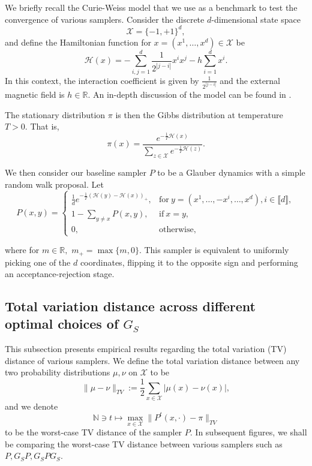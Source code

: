 \documentclass[EJP]{ejpecp} %
\begin{document}
We briefly recall the Curie-Weiss model that we use as a benchmark to test the convergence of various samplers. Consider the discrete $d$-dimensional state space 
$$\mathcal{X} = \{-1, +1\}^d,$$
and define the Hamiltonian function for $x = (x^1, \dots, x^d) \in \mathcal{X}$ be  
$$\mathcal{H}(x) = - \sum_{i,j=1}^d \frac{1}{2^{|j-i|}} x^i x^j - h \sum_{i=1}^d x^i.$$
In this context, the interaction coefficient is given by $\frac{1}{2^{|j-i|}}$ and the external magnetic field is $h \in \mathbb{R}$. An in-depth discussion of the model can be found in \cite{Bovier_denHollander_2015}.

The stationary distribution $\pi$ is then the Gibbs distribution at temperature $T > 0.$ That is, 
$$\pi(x) = \frac{e^{-\frac{1}{T} \mathcal{H}(x)}}{\sum_{z\in \mathcal{X}}e^{-\frac{1}{T} \mathcal{H}(z)}}.$$

We then consider our baseline sampler $P$ to be a Glauber dynamics with a simple random walk proposal. Let 
\begin{equation} \label{eq:glauber}
    P(x,y) = \begin{cases}
    \frac{1}{d} e^{-\frac{1}{T}(\mathcal{H}(y)-\mathcal{H}(x))_+}, & \mathrm{for}\ y = (x^1, \dots, -x^i, \dots, x^d), i \in \llbracket d \rrbracket,\\
    1-\sum_{y \neq x} P(x,y), & \mathrm{if}\ x = y,\\
    0, & \mathrm{otherwise,}
\end{cases}
\end{equation}

where for $m \in \mathbb{R},$ $m_+ = \max\{m,0\}$. This sampler is equivalent to uniformly picking one of the $d$ coordinates, flipping it to the opposite sign and performing an acceptance-rejection stage.

\subsection{Total variation distance across different optimal choices of $G_S$}
This subsection presents empirical results regarding the total variation (TV) distance of various samplers. We define the total variation distance between any two probability distributions $\mu, \nu$ on $\mathcal{X}$ to be 
$$\| \mu - \nu \|_{TV} := \frac{1}{2} \sum_{x\in \mathcal{X}} |\mu(x)-\nu(x)|,$$
and we denote
$$\mathbb{N} \ni t \mapsto \max_{x\in \mathcal{X}} \|P^t(x,\cdot) - \pi \|_{TV}$$
to be the worst-case TV distance of the sampler $P$. In subsequent figures, we shall be comparing the worst-case TV distance between various samplers such as $P, G_S P, G_S P G_S$.
\end{document}
